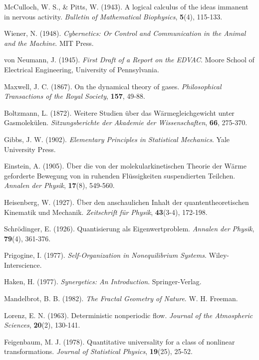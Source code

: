 \documentclass[12pt,a4paper]{article}
\begin{document}
\begin{thebibliography}{99}
McCulloch, W. S., \& Pitts, W. (1943). A logical calculus of the ideas immanent in nervous activity. \textit{Bulletin of Mathematical Biophysics}, \textbf{5}(4), 115-133.

Wiener, N. (1948). \textit{Cybernetics: Or Control and Communication in the Animal and the Machine}. MIT Press.

von Neumann, J. (1945). \textit{First Draft of a Report on the EDVAC}. Moore School of Electrical Engineering, University of Pennsylvania.

Maxwell, J. C. (1867). On the dynamical theory of gases. \textit{Philosophical Transactions of the Royal Society}, \textbf{157}, 49-88.

Boltzmann, L. (1872). Weitere Studien über das Wärmegleichgewicht unter Gasmolekülen. \textit{Sitzungsberichte der Akademie der Wissenschaften}, \textbf{66}, 275-370.

Gibbs, J. W. (1902). \textit{Elementary Principles in Statistical Mechanics}. Yale University Press.

Einstein, A. (1905). Über die von der molekularkinetischen Theorie der Wärme geforderte Bewegung von in ruhenden Flüssigkeiten suspendierten Teilchen. \textit{Annalen der Physik}, \textbf{17}(8), 549-560.

Heisenberg, W. (1927). Über den anschaulichen Inhalt der quantentheoretischen Kinematik und Mechanik. \textit{Zeitschrift für Physik}, \textbf{43}(3-4), 172-198.

Schrödinger, E. (1926). Quantisierung als Eigenwertproblem. \textit{Annalen der Physik}, \textbf{79}(4), 361-376.

Prigogine, I. (1977). \textit{Self-Organization in Nonequilibrium Systems}. Wiley-Interscience.

Haken, H. (1977). \textit{Synergetics: An Introduction}. Springer-Verlag.

Mandelbrot, B. B. (1982). \textit{The Fractal Geometry of Nature}. W. H. Freeman.

Lorenz, E. N. (1963). Deterministic nonperiodic flow. \textit{Journal of the Atmospheric Sciences}, \textbf{20}(2), 130-141.

Feigenbaum, M. J. (1978). Quantitative universality for a class of nonlinear transformations. \textit{Journal of Statistical Physics}, \textbf{19}(25), 25-52.


\end{thebibliography}
\end{document}
